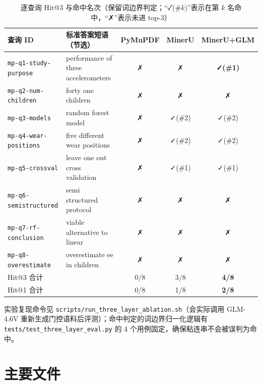 \documentclass[UTF8,a4paper,11pt]{ctexart}
\begin{document}
\begin{table}[H]
\centering
\caption{逐查询 Hit@3 与命中名次（保留词边界判定；``✓(\#$k$)''表示在第 $k$ 名命中，``✗''表示未进 top-3）}
\label{tab:rag-perquery}
\small
\begin{tabular}{llccc}
\toprule
查询 ID & 标准答案短语（节选） & PyMuPDF & MinerU & MinerU+GLM \\
\midrule
\texttt{mp-q1-study-purpose}  & performance of three accelerometers & ✗ & ✗ & \textbf{✓(\#1)} \\
\texttt{mp-q2-num-children}   & forty one children                  & ✗ & ✗ & ✗ \\
\texttt{mp-q3-models}         & random forest model                 & ✗ & ✓(\#2) & ✓(\#2) \\
\texttt{mp-q4-wear-positions} & five different wear positions        & ✗ & ✓(\#2) & ✓(\#2) \\
\texttt{mp-q5-crossval}       & leave one out cross validation       & ✗ & ✓(\#1) & ✓(\#1) \\
\texttt{mp-q6-semistructured} & semi structured protocol             & ✗ & ✗ & ✗ \\
\texttt{mp-q7-rf-conclusion}  & viable alternative to linear         & ✗ & ✗ & ✗ \\
\texttt{mp-q8-overestimate}   & overestimate ee in children          & ✗ & ✗ & ✗ \\
\midrule
\multicolumn{2}{l}{Hit@3 合计} & 0/8 & 3/8 & \textbf{4/8} \\
\multicolumn{2}{l}{Hit@1 合计} & 0/8 & 1/8 & \textbf{2/8} \\
\bottomrule
\end{tabular}
\end{table}

实验复现命令见 \texttt{scripts/run\_three\_layer\_ablation.sh}（会实际调用 GLM-4.6V 重新生成门控语料后评测）；命中判定的词边界归一化逻辑有 \texttt{tests/test\_three\_layer\_eval.py} 的 4 个用例固定，确保粘连串不会被误判为命中。

\section{主要文件}
\end{document}
